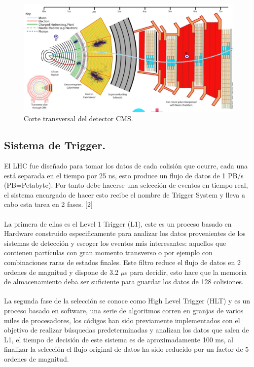\begin{figure}
\centering
\includegraphics[width=15cm]{F3.png}
\caption{\label{fig:frog} Corte transversal del detector CMS.}
\end{figure}

\subsection{Sistema de Trigger.}

El LHC fue diseñado para tomar los datos de cada colisión que ocurre, cada una está separada en el tiempo por 25 ns, esto produce un flujo de datos de 1 PB/s (PB=Petabyte). Por tanto debe hacerse una selección de eventos en tiempo real, el sistema encargado de hacer esto recibe el nombre de Trigger System y lleva a cabo esta tarea en 2 fases. [2]
\\
\\
La primera de ellas es el Level 1 Trigger (L1), este es un proceso basado en Hardware construido especificamente para analizar los datos provenientes de los sistemas de detección y escoger los eventos más interesantes: aquellos que contienen partículas con gran momento transverso o por ejemplo con combinaciones raras de estados finales. Este filtro reduce el flujo de datos en 2 ordenes de magnitud y dispone de 3.2 $\mu$s para decidir, esto hace que la memoria de almacenamiento deba ser suficiente para guardar los datos de 128  colisiones.
\\
\\
La segunda fase de la selección se conoce como High Level Trigger (HLT) y es un proceso basado en software, una serie de algoritmos corren en granjas de varios miles de procesadores, los códigos han sido previamente implementados con el objetivo de realizar búsquedas predeterminadas y analizan los datos que salen de L1, el tiempo de decisión de este sistema es de aproximadamente 100 ms, al finalizar la selección el flujo original de datos ha sido reducido por un factor de 5 ordenes de magnitud.

